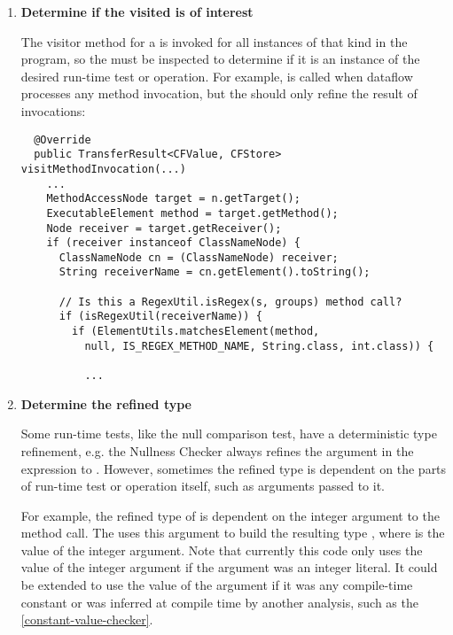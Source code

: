 \begin{enumerate}
\item \textbf{Determine if the visited  is of
    interest}

The visitor method for a  is invoked for all
instances of that  kind in the program, so the
 must be inspected to determine if it is an
instance of the desired run-time test or operation. For example,
 is called when dataflow processes any method
invocation, but the  should only refine
the result of  invocations:

\begin{smaller}
\begin{Verbatim}
  @Override
  public TransferResult<CFValue, CFStore> visitMethodInvocation(...)
    ...
    MethodAccessNode target = n.getTarget();
    ExecutableElement method = target.getMethod();
    Node receiver = target.getReceiver();
    if (receiver instanceof ClassNameNode) {
      ClassNameNode cn = (ClassNameNode) receiver;
      String receiverName = cn.getElement().toString();

      // Is this a RegexUtil.isRegex(s, groups) method call?
      if (isRegexUtil(receiverName)) {
        if (ElementUtils.matchesElement(method,
          null, IS_REGEX_METHOD_NAME, String.class, int.class)) {

          ...

\end{Verbatim}
\end{smaller}

\item \textbf{Determine the refined type}

Some run-time tests, like the null comparison test, have a deterministic type
refinement, e.g. the Nullness Checker always refines the argument in the
expression to .  However, sometimes the refined type is dependent
on the parts of run-time test or operation itself, such as arguments passed to
it.

For example, the refined type of  is dependent on the
integer argument to the method call. The 
uses this argument to build the resulting type , where 
is the value of the integer argument.  Note that currently this code only uses
the value of the integer argument if the argument was an integer literal.  It
could be extended to use the value of the argument if it was any compile-time
constant or was inferred at compile time by another analysis, such as the
\ref{constant-value-checker}.


\end{enumerate}
